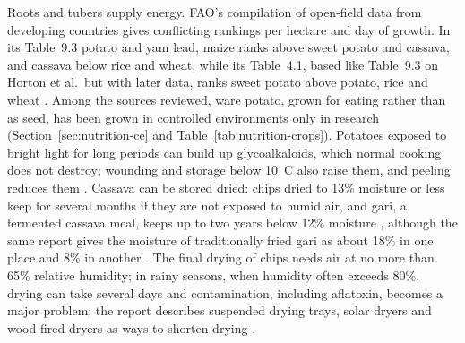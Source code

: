 Roots and tubers supply energy. FAO's compilation of open-field data from developing countries gives conflicting rankings per hectare and day of growth. In its Table~9.3 potato and yam lead, maize ranks above sweet potato and cassava, and cassava below rice and wheat, while its Table~4.1, based like Table~9.3 on Horton et al.\ but with later data, ranks sweet potato above potato, rice and wheat \cite[p.~126; Table~9.3, p.~127; Table~4.1, p.~38]{fao1990roots}. Among the sources reviewed, ware potato, grown for eating rather than as seed, has been grown in controlled environments only in research (Section~\ref{sec:nutrition-ce} and Table~\ref{tab:nutrition-crops}). Potatoes exposed to bright light for long periods can build up glycoalkaloids, which normal cooking does not destroy; wounding and storage below 10~\textdegree{}C also raise them, and peeling reduces them \cite[pp.~100--101]{fao1990roots}.%
 Cassava can be stored dried: chips dried to 13\% moisture or less keep for several months if they are not exposed to humid air, and gari, a fermented cassava meal, keeps up to two years below 12\% moisture \cite[Section~5.1.1.5; Table~5.1]{fao1998rootsstorage}, although the same report gives the moisture of traditionally fried gari as about 18\% in one place and 8\% in another \cite[Section~5.1.2.4; Table~5.2]{fao1998rootsstorage}. The final drying of chips needs air at no more than 65\% relative humidity; in rainy seasons, when humidity often exceeds 80\%, drying can take several days and contamination, including aflatoxin, becomes a major problem; the report describes suspended drying trays, solar dryers and wood-fired dryers as ways to shorten drying \cite[Section~5.1.1.4]{fao1998rootsstorage}.%

